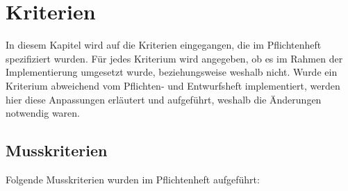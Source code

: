 
\chapter{Kriterien}
\label{chap:kriterien}

In diesem Kapitel wird auf die Kriterien eingegangen, die im Pflichtenheft spezifiziert wurden.
Für jedes Kriterium wird angegeben, ob es im Rahmen der Implementierung umgesetzt wurde, beziehungsweise weshalb nicht.
Wurde ein Kriterium abweichend vom Pflichten- und Entwurfsheft implementiert, werden hier diese Anpassungen erläutert und aufgeführt, weshalb die Änderungen notwendig waren.

\section{Musskriterien}\label{sec:musskriterien}

Folgende Musskriterien wurden im Pflichtenheft aufgeführt:


